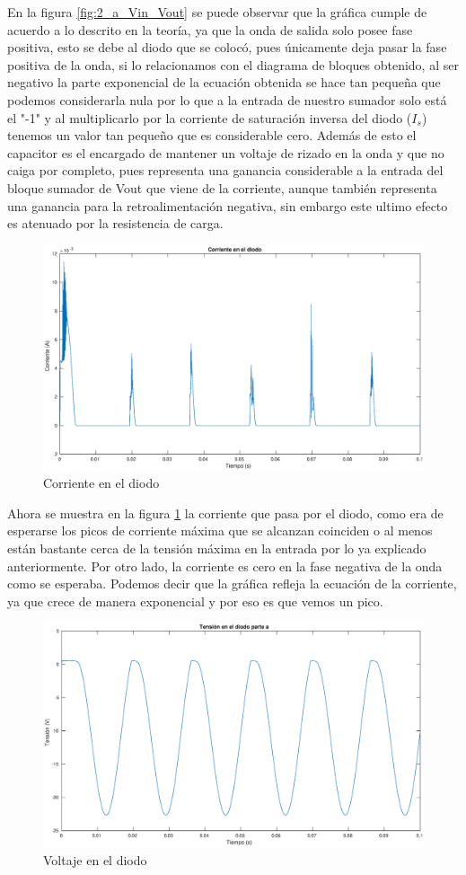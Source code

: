 \documentclass[12pt,letterpaper]{article}
\begin{document}
En la figura \ref{fig:2_a_Vin_Vout} se puede observar que la gráfica cumple de acuerdo a lo descrito en la teoría, ya que la onda de salida solo posee fase positiva, esto se debe al diodo que se colocó, pues únicamente deja pasar la fase positiva de la onda, si lo relacionamos con el diagrama de bloques obtenido, al ser negativo la parte exponencial de la ecuación obtenida  se hace tan pequeña que podemos considerarla nula por lo que a la entrada de nuestro sumador solo está el "-1" y al multiplicarlo por la corriente de saturación inversa del diodo ($I_s$) tenemos un valor tan pequeño que es considerable cero. Además de esto el capacitor es el encargado de mantener un voltaje de rizado en la onda y que no caiga por completo, pues representa una ganancia considerable a la entrada del bloque sumador de Vout que viene de la corriente, aunque también representa una ganancia para la retroalimentación negativa, sin embargo este ultimo efecto es atenuado por la resistencia de carga.

\begin{figure}[ht!]
  \centering
  \includegraphics[width=0.8\linewidth]{pictures/Ejercicio2_a_corriente_diodo.eps}
  \caption{Corriente en el diodo}
  \label{fig:2_a_Id}
\end{figure}

Ahora se muestra en la figura \ref{fig:2_a_Id} la corriente que pasa por el diodo, como era de esperarse los picos de corriente máxima que se alcanzan coinciden o al menos están bastante cerca de la tensión máxima en la entrada por lo ya explicado anteriormente. Por otro lado, la corriente es cero en la fase negativa de la onda como se esperaba. Podemos decir que la gráfica refleja la ecuación de la corriente, ya que crece de manera exponencial y por eso es que vemos un pico.

\begin{figure}[ht!]
  \centering
  \includegraphics[width=0.8\linewidth]{pictures/Ejercicio2_a_Vd.eps}
  \caption{Voltaje en el diodo}
  \label{fig:2_a_Vd}
\end{figure}
\end{document}
